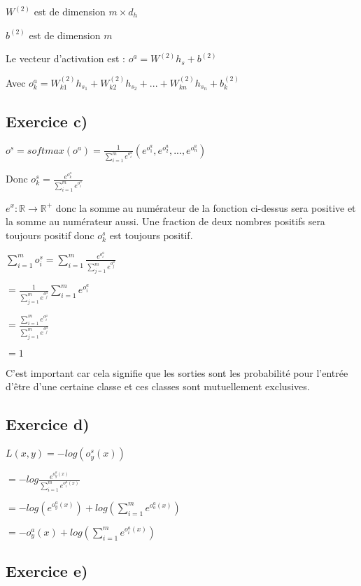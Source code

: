 \documentclass[a4paper,10pt]{article}
\begin{document}
$W^{(2)}$ est de dimension $m \times d_{h}$

$b^{(2)}$ est de dimension $m$

Le vecteur d'activation est : $o^{a} = W^{(2)} h_{s} + b^{(2)}$

Avec $o^{a}_{k} = W^{(2)}_{k1} h_{s_1} + W^{(2)}_{k2} h_{s_2} + ... + W^{(2)}_{kn} h_{s_n} + b^{(2)}_{k}$

\subsection{Exercice c)}

$o^{s} = softmax(o^{a}) = \frac{1}{\sum_{i=1}^{m} e^{o^{a}_{i}}}  (e^{o^{a}_{1}}, e^{o^{a}_{2}}, ..., e^{o^{a}_{n}})$

Donc $o^{s}_{k} = \frac{e^{o^{a}_{k}}}{\sum_{i=1}^{m} e^{o^{a}_{i}}}$

$e^{x} : \mathds{R} \rightarrow \mathds{R}^{+}$ donc la somme au numérateur de la fonction ci-dessus sera positive et la somme au numérateur aussi. Une fraction de deux nombres positifs sera toujours positif donc $o^{s}_{k}$ est toujours positif.

$\sum^{m}_{i=1} o^{s}_{i} = \sum^{m}_{i=1} \frac{e^{o^{a}_{i}}}{\sum_{j=1}^{m} e^{o^{a}_{j}}}$

$ = \frac{1}{\sum_{j=1}^{m} e^{o^{a}_{j}}} \sum^{m}_{i=1} e^{o^{a}_{i}}$

$ = \frac{\sum^{m}_{i=1} e^{o^{a}_{i}}}{\sum_{j=1}^{m} e^{o^{a}_{j}}}$

$ =1 $


C'est important car cela signifie que les sorties sont les probabilité pour l'entrée d'être d'une certaine classe et ces classes sont mutuellement exclusives.

\subsection{Exercice d)}

$ L(x,y) = -log  (o^{s}_{y}(x)) $

$= -log \frac{e^{o^{a}_{y}(x)}}{\sum_{i=1}^{m} e^{o^{a}_{i}(x)}}$ 

$= -log(e^{o^{a}_{y}(x)}) +log(\sum_{i=1}^{m} e^{o^{a}_{o}(x)})  $

$ = -o^{a}_{y}(x) + log(\sum_{i=1}^{m} e^{o^{a}_{i}(x)})$

\subsection{Exercice e)} 
\end{document}
